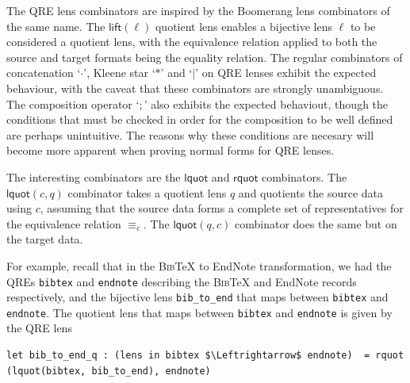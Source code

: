 \documentclass[acmsmall,review,anonymous]{acmart}
\newcommand{\kw}[1]{\ensuremath{\mathsf{#1}}}
\newcommand{\bibtex}{\textsc{Bib}\TeX{}}
\newcommand{\eqrel}[1]{\ensuremath{\equiv_{#1}}}
\newcommand{\cd}[1]{\lstinline[backgroundcolor=\color{white}]$#1$}
\begin{document}
The QRE lens combinators are inspired by the Boomerang lens combinators of the
same name. The $\kw{lift}(\ell)$ quotient lens enables a bijective lens
$\ell$ to be considered a quotient lens, with the equivalence relation applied
to both the source and target formats being the equality relation. The
regular combinators of concatenation `$\cdot$', Kleene star `$*$' and
`$|$' on QRE lenses exhibit the expected behaviour, with the caveat that these
combinators are strongly unambiguous. The composition operator `$;$' also
exhibits the expected behaviout, though the conditions that must be checked in
order for the composition to be well defined are perhaps unintuitive. The
reasons why these conditions are necesary will become more apparent when
proving normal forms for QRE lenses.

The interesting combinators are the $\kw{lquot}$ and $\kw{rquot}$
combinators. The $\kw{lquot}(c, q)$ combinator takes a quotient lens $q$ and
quotients the source data using $c$, assuming that the source data forms a
complete set of representatives for the equivalence relation $\eqrel{c}$. The
$\kw{lquot}(q, c)$ combinator does the same but on the target data.

For example, recall that in the \bibtex{} to EndNote transformation, we had the
QREs \cd{bibtex} and \cd{endnote} describing the \bibtex{} and EndNote records
respectively, and the bijective lens \cd{bib_to_end} that maps between
\cd{bibtex} and \cd{endnote}. The quotient lens that maps between
\cd{bibtex} and \cd{endnote} is given by the QRE lens

\begin{lstlisting}
let bib_to_end_q : (lens in bibtex $\Leftrightarrow$ endnote)  = rquot (lquot(bibtex, bib_to_end), endnote)
\end{lstlisting}

\end{document}
